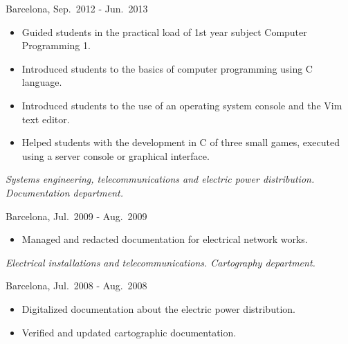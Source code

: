 \begin{description}[itemsep=15pt]
        Barcelona, Sep.\ 2012 - Jun.\ 2013
        \begin{itemize}
            \item Guided students in the practical load of 1st year subject Computer Programming 1.
            \item Introduced students to the basics of computer programming using C language.
            \item Introduced students to the use of an operating system console and the Vim text editor.
            \item Helped students with the development in C of three small games, executed using a server console or graphical interface.
        \end{itemize}

    \item[ITC-2, Technical Assistant] \hfill

        \emph{Systems engineering, telecommunications and electric power distribution. Documentation department.}

        Barcelona, Jul.\ 2009 - Aug.\ 2009
        \begin{itemize}
            \item Managed and redacted documentation for electrical network works.
        \end{itemize}

    \item[Spark Ibérica, Technical Assistant] \hfill

        \emph{Electrical installations and telecommunications. Cartography department.}

        Barcelona, Jul.\ 2008 - Aug.\ 2008
        \begin{itemize}
            \item Digitalized documentation about the electric power distribution.
            \item Verified and updated cartographic documentation.
        \end{itemize}

\end{description}